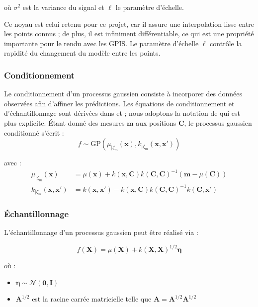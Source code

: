 où $\sigma^2$ est la variance du signal et $\ell$ le paramètre d'échelle.

Ce noyau est celui retenu pour ce projet, car il assure une interpolation lisse entre les points connus ; de plus, il est infiniment différentiable, ce qui est une propriété importante pour le rendu avec les GPIS. Le paramètre d'échelle $\ell$ contrôle la rapidité du changement du modèle entre les points.

\subsubsection{Conditionnement}
Le conditionnement d'un processus gaussien consiste à incorporer des données observées afin d'affiner les prédictions. Les équations de conditionnement et d'échantillonnage sont dérivées dans \textcite{martens2016gpis} et \textcite{seyb24from}; nous adoptons la notation de \textcite{seyb24from} qui est plus explicite. Étant donné des mesures $\mathbf{m}$ aux positions $\mathbf{C}$, le processus gaussien conditionné s'écrit :
\begin{equation}
f \sim \text{GP}\left(\mu_{|\zeta_m}(\mathbf{x}), k_{|\zeta_m}(\mathbf{x}, \mathbf{x}')\right)
\end{equation}

avec :
\begin{align}
\mu_{|\zeta_m}(\mathbf{x}) &= \mu(\mathbf{x}) + k(\mathbf{x}, \mathbf{C}) k(\mathbf{C}, \mathbf{C})^{-1} (\mathbf{m} - \mu(\mathbf{C})) \\
 k_{|\zeta_m}(\mathbf{x}, \mathbf{x}') &= k(\mathbf{x}, \mathbf{x}') - k(\mathbf{x}, \mathbf{C}) k(\mathbf{C}, \mathbf{C})^{-1} k(\mathbf{C}, \mathbf{x}')
\end{align}

\subsubsection{Échantillonnage}

L'échantillonnage d'un processus gaussien peut être réalisé via :

\begin{equation}
\label{eq:echantillonnage}
f(\mathbf{X}) = \mu(\mathbf{X}) + k(\mathbf{X}, \mathbf{X})^{1/2} \boldsymbol{\eta}
\end{equation}

où :
\begin{itemize}[noitemsep]
    \item $\boldsymbol{\eta} \sim \mathcal{N}(\mathbf{0}, \mathbf{I})$
    \item $\mathbf{A}^{1/2}$ est la racine carrée matricielle telle que $\mathbf{A} = \mathbf{A}^{1/2}\mathbf{A}^{1/2}$
\end{itemize}

